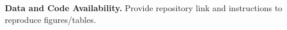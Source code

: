 \documentclass[sn-basic]{sn-jnl} %
\begin{document}
\vspace{1em}
\noindent\textbf{Data and Code Availability.} Provide repository link and instructions to reproduce figures/tables.





%
\end{document}
